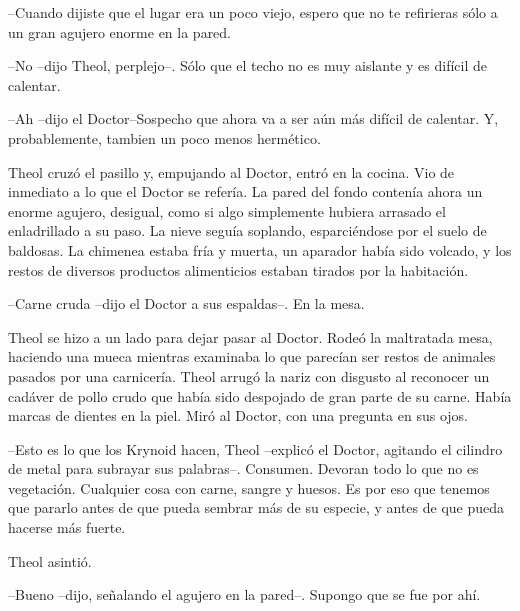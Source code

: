 --Cuando dijiste que el lugar era un poco viejo, espero que no te refirieras sólo a un gran agujero enorme en la pared.



--No --dijo Theol, perplejo--. Sólo que el techo no es muy aislante y es difícil de calentar.



--Ah --dijo el Doctor--Sospecho que ahora va a ser aún más difícil de calentar. Y, probablemente, tambien un poco menos hermético.



Theol cruzó el pasillo y, empujando al Doctor, entró en la cocina. Vio de inmediato a lo que el Doctor se refería. La pared del fondo contenía ahora un enorme agujero, desigual, como si algo simplemente hubiera arrasado el enladrillado a su paso. La nieve seguía soplando, esparciéndose por el suelo de baldosas. La chimenea estaba fría y muerta, un aparador había sido volcado, y los restos de diversos productos alimenticios estaban tirados por la habitación.



--Carne cruda --dijo el Doctor a sus espaldas--. En la mesa.



Theol se hizo a un lado para dejar pasar al Doctor. Rodeó la maltratada mesa, haciendo una mueca mientras examinaba lo que parecían ser restos de animales pasados por una carnicería. Theol arrugó la nariz con disgusto al reconocer un cadáver de pollo crudo que había sido despojado de gran parte de su carne. Había marcas de dientes en la piel. Miró al Doctor, con una pregunta en sus ojos.



--Esto es lo que los Krynoid hacen, Theol --explicó el Doctor, agitando el cilindro de metal para subrayar sus palabras--. Consumen. Devoran todo lo que no es vegetación. Cualquier cosa con carne, sangre y huesos. Es por eso que tenemos que pararlo antes de que pueda sembrar más de su especie, y antes de que pueda hacerse más fuerte.



Theol asintió.

--Bueno --dijo, señalando el agujero en la pared--. Supongo que se fue por ahí.

